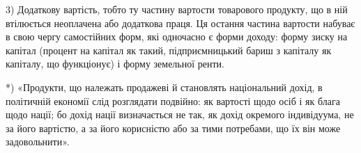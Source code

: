 3) Додаткову вартість, тобто ту частину вартости товарового продукту,
що в ній втілюється неоплачена або додаткова праця. Ця остання частина
вартости набуває в свою чергу самостійних форм, які одночасно є форми
доходу: форму зиску на капітал (процент на капітал як такий, підприємницький
бариш з капіталу як капіталу, що функціонує) і форму земельної ренти.

*) «Продукти, що належать продажеві й становлять національний дохід, в політичній економії слід
розглядати подвійно: як вартості щодо осіб і як блага щодо нації; бо дохід нації визначається не
так, як дохід окремого індивідуума, не за його вартістю, а за його корисністю або за тими потребами,
що їх він може задовольнити».
